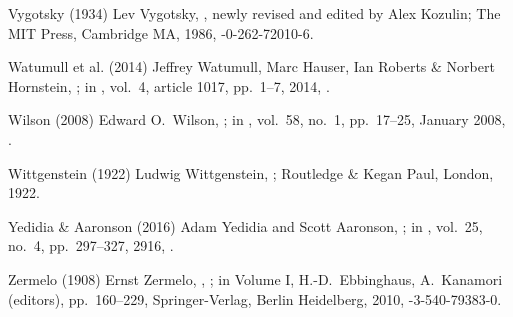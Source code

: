 \biblabel Vygotsky (1934)
Lev Vygotsky,
,
newly revised and edited by Alex Kozulin;
The MIT Press, Cambridge MA, 1986,
-0-262-72010-6.

\biblabel Watumull et al. (2014)
Jeffrey Watumull, Marc Hauser, Ian Roberts \& Norbert Hornstein,
; in
,
vol.\ 4, article 1017, pp.\ 1--7, 2014,
.

\biblabel Wilson (2008)
Edward O.\ Wilson,
;
in ,
vol.\ 58, no.\ 1, pp.\ 17--25, January 2008,
.

\biblabel Wittgenstein (1922)
Ludwig Wittgenstein,
;
Routledge \& Kegan Paul, London, 1922.

\biblabel Yedidia \& Aaronson (2016)
Adam Yedidia and Scott Aaronson,
;
in ,
vol.\ 25, no.\ 4, pp.\ 297--327, 2916,
.

\biblabel Zermelo (1908)
Ernst Zermelo,
,
;
in  Volume I,
H.-D.\ Ebbinghaus, A.\ Kanamori (editors),
pp.\ 160--229,
Springer-Verlag, Berlin Heidelberg, 2010,
-3-540-79383-0.

\endinput
